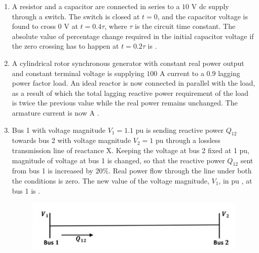 \documentclass[journal,12pt,onecolumn]{IEEEtran}
\theoremstyle{remark}
\begin{document}
\begin{enumerate}[start=1, label=Q.\arabic*]
    \hfill{}

    \item A resistor and a capacitor are connected in series to a $10$ V dc supply through a switch. The switch is closed at $t=0$, and the capacitor voltage is found to cross $0$ V at $t=0.4\tau$, where $\tau$ is the circuit time constant. The absolute value of percentage change required in the initial capacitor voltage if the zero crossing has to happen at $t=0.2\tau$ is \underline{\hspace{2cm}} .

    \hfill{}

    \item A cylindrical rotor synchronous generator with constant real power output and constant terminal voltage is supplying $100$ A current to a $0.9$ lagging power factor load. An ideal reactor is now connected in parallel with the load, as a result of which the total lagging reactive power requirement of the load is twice the previous value while the real power remains unchanged. The armature current is now \underline{\hspace{2cm}} A .

    \hfill{}

    \item Bus 1 with voltage magnitude $V_1 = 1.1$ pu is sending reactive power $Q_{12}$ towards bus 2 with voltage magnitude $V_2 = 1$ pu through a lossless transmission line of reactance X. Keeping the voltage at bus 2 fixed at 1 pu, magnitude of voltage at bus 1 is changed, so that the reactive power $Q_{12}$ sent from bus 1 is increased by $20\%$. Real power flow through the line under both the conditions is zero. The new value of the voltage magnitude, $V_1$, in pu , at bus 1 is \underline{\hspace{2cm}}.
    \begin{figure}[H]
        \centering
        \includegraphics[width=0.5\columnwidth]{Figures/qs60.png}
        \caption{}
    \end{figure}

    \hfill{}


\end{enumerate}
\end{document}
